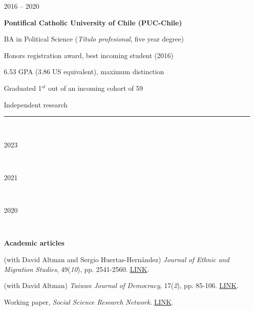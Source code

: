 \documentclass[a4paper, 12pt]{article}
\begin{document}
\begin{multicols}{2}

2016 -- 2020

\columnbreak

\begin{flushright}

\textbf{Pontifical Catholic University of Chile (PUC-Chile)}

\medskip

BA in Political Science (\textit{Título profesional}, five year degree)

Honors registration award, best incoming student (2016)

6.53 GPA (3.86 US equivalent), maximum distinction

Graduated 1$^{st}$ out of an incoming cohort of 59

\end{flushright}

\end{multicols}





\large Independent research

\smallskip

\hrule

\normalsize

\begin{multicols}{2}

\textcolor{white}{XXXX}

2023

\textcolor{white}{XXXX}

2021

\textcolor{white}{XXXX}

2020

\textcolor{white}{XXXX}

\columnbreak

\begin{flushright}

\textbf{Academic articles}

\medskip

(with David Altman and Sergio Huertas-Hernández)  \textit{Journal of Ethnic and Migration Studies}, 49(\textit{10}), pp. 2541-2560. \href{https://www.tandfonline.com/doi/full/10.1080/1369183X.2023.2182713}{LINK}.

(with David Altman)  \textit{Taiwan Journal of Democracy}, 17(\textit{2}), pp. 85-106. \href{https://www.tfd.org.tw/en/publication/journal}{LINK}.

 Working paper, \textit{Social Science Research Network}. \href{https://ssrn.com/abstract=3866860}{LINK}.

\end{flushright}

\end{multicols}
\end{document}
